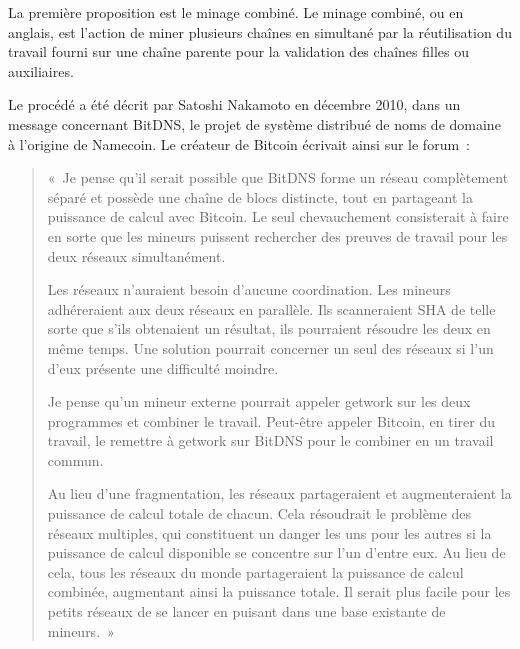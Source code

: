 
La première proposition est le minage combiné. Le minage combiné, ou  en anglais, est l'action de miner plusieurs chaînes en simultané par la réutilisation du travail fourni sur une chaîne parente pour la validation des chaînes filles ou auxiliaires.

Le procédé a été décrit par Satoshi Nakamoto en décembre 2010, dans un message concernant BitDNS, le projet de système distribué de noms de domaine à l'origine de Namecoin. Le créateur de Bitcoin écrivait ainsi sur le forum~:

\begin{quote}
«~Je pense qu'il serait possible que BitDNS forme un réseau complètement séparé et possède une chaîne de blocs distincte, tout en partageant la puissance de calcul avec Bitcoin. Le seul chevauchement consisterait à faire en sorte que les mineurs puissent rechercher des preuves de travail pour les deux réseaux simultanément.

Les réseaux n'auraient besoin d'aucune coordination. Les mineurs adhéreraient aux deux réseaux en parallèle. Ils scanneraient SHA de telle sorte que s'ils obtenaient un résultat, ils pourraient résoudre les deux en même temps. Une solution pourrait concerner un seul des réseaux si l'un d'eux présente une difficulté moindre.

Je pense qu'un mineur externe pourrait appeler getwork sur les deux programmes et combiner le travail. Peut-être appeler Bitcoin, en tirer du travail, le remettre à getwork sur BitDNS pour le combiner en un travail commun.

Au lieu d'une fragmentation, les réseaux partageraient et augmenteraient la puissance de calcul totale de chacun. Cela résoudrait le problème des réseaux multiples, qui constituent un danger les uns pour les autres si la puissance de calcul disponible se concentre sur l'un d'entre eux. Au lieu de cela, tous les réseaux du monde partageraient la puissance de calcul combinée, augmentant ainsi la puissance totale. Il serait plus facile pour les petits réseaux de se lancer en puisant dans une base existante de mineurs.~»
\end{quote}

